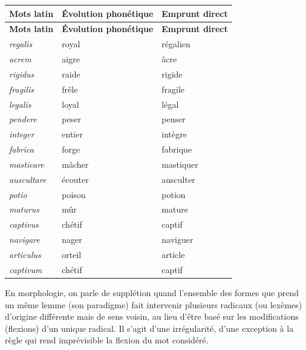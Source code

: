\begin{longtable}{p{.27\linewidth}p{.29\linewidth}p{.29\linewidth}}
\toprule\textbf{Mots latin}&\textbf{Évolution phonétique}&\textbf{Emprunt direct}\\\midrule\endfirsthead
\toprule\textbf{Mots latin}&\textbf{Évolution phonétique}&\textbf{Emprunt direct}\\\midrule\endhead
\textit{regalis}&royal&régalien\\
\textit{acrem}&aigre&âcre\\
\textit{rigidus}&raide&rigide\\
\textit{fragilis}&frêle&fragile\\
\textit{legalis}&loyal&légal\\\midrule
\textit{pendere}&peser&penser\\
\textit{integer}&entier&intègre\\
\textit{fabrica}&forge&fabrique\\
\textit{masticare}&mâcher&mastiquer\\
\textit{auscultare}&écouter&ausculter\\\midrule
\textit{potio}&poison&potion\\
\textit{maturus}&mûr&mature\\
\textit{captivus}&chétif&captif\\
\textit{navigare}&nager&naviguer\\
\textit{articulus}&orteil&article\\
\textit{captivum}&chétif&captif\\\bottomrule
\end{longtable}

En morphologie, on parle de supplétion quand l’ensemble des formes que prend un même lemme (son paradigme) fait intervenir plusieurs radicaux (ou lexèmes) d’origine différente mais de sens voisin, au lieu d’être basé sur les modifications (flexions) d’un unique radical. Il s’agit d’une irrégularité, d’une exception à la règle qui rend imprévisible la flexion du mot considéré.

